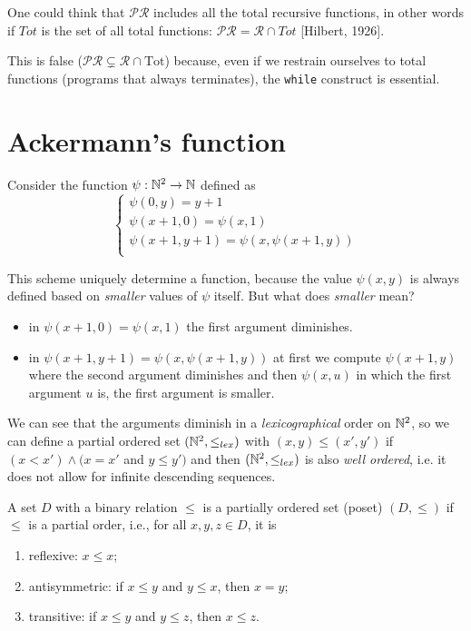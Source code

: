 One could think that $\mathcal{PR}$ includes all the total recursive
functions, in other words if $Tot$ is the set of all total functions:
$\mathcal{PR} = \mathcal{R} \cap Tot$ [Hilbert, 1926].

This is false
($\mathcal{PR} \subsetneq \mathcal{R} \cap \text{Tot}$) because, even
if we restrain ourselves to total functions (programs that always
terminates), the \texttt{while} construct is essential.

\section{Ackermann's function}
Consider the function $\psi: \mathbb{N}^2 \rightarrow \mathbb{N}$ defined as
\begin{equation*}
  \begin{cases}
    \psi(0,y) = y+1\\
    \psi(x+1,0) = \psi(x,1)\\
    \psi(x+1,y+1) = \psi(x, \psi(x+1, y))\\
  \end{cases}
\end{equation*}

This scheme uniquely determine a function, because the value $\psi(x,y)$ is always defined
based on \emph{smaller} values of $\psi$ itself. But what does \emph{smaller} mean?

\begin{itemize}
  \item in $\psi(x+1,0) = \psi(x,1)$ the first argument
  diminishes.
  \item in $\psi(x+1,y+1)=\psi(x, \psi(x+1, y))$ at first we compute $\psi(x+1, y)$
  where the second argument diminishes and then $\psi(x,u)$ in which the first argument
  $u$ is, the first argument is smaller.
\end{itemize}
 

We can see that the arguments diminish in a \emph{lexicographical}
order on $\mathbb{N}^2$, so we can define a partial ordered set 
$(\mathbb{N}^2, \leq_{lex} )$ with $(x,y) \leq (x', y')$
if $(x < x') \wedge (x=x'$ and $y \leq y')$ and then
$( \mathbb{N}^2, \leq_{lex} )$ is also \emph{well ordered}, i.e.
it does not allow for infinite descending sequences.

\begin{definition}
  A set $D$ with a binary relation $\leq$ is a partially ordered set (poset) $(D, \leq)$ if $\leq$ is a partial order, i.e., for all $x,y,z\in D$, it is
  \begin{enumerate}
    \item reflexive: $x\leq x$;
    \item antisymmetric: if $x\leq y$ and $y\leq x$, then $ x=y $;
    \item transitive: if $x\leq y$ and $y\leq z$, then $x \leq z$.
  \end{enumerate}
\end{definition}

